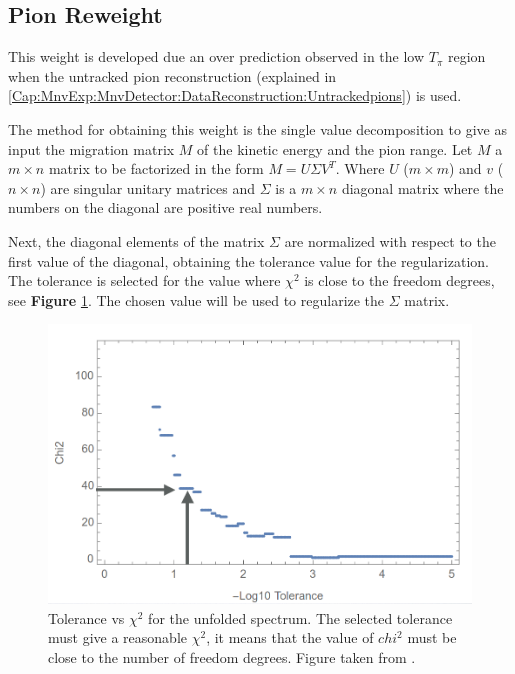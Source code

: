 \pagebreak

\subsection{Pion Reweight }
\label{Cap:Simulation:MnvGENIETunes:PionReweight}

This weight is developed due an over prediction observed in the low $T_\pi$ region when the untracked pion reconstruction (explained in \ref{Cap:MnvExp:MnvDetector:DataReconstruction:Untrackedpions}) is used.

The method for obtaining this weight is the single value decomposition to give as input the migration matrix $M$ of the kinetic energy and the pion range. Let $M$ a $m\times n$ matrix to be factorized in the form $M=U\Sigma V^T$. Where $U$ ($m\times m$) and $v$ ($n\times n$) are singular unitary matrices and $\Sigma$ is a $m\times n$ diagonal matrix where the numbers on the diagonal are positive real numbers. 

Next, the diagonal elements of the matrix $\Sigma$ are normalized with respect to the first value of the diagonal, obtaining the tolerance value for the regularization. The tolerance is selected for the value where $\chi^2$ is close to the freedom degrees, see \textbf{Figure} \ref{fig:Simulation:MnvGENIETunes:PionReweight:ToleranceTpiWeight}. The chosen value will be used to regularize the $\Sigma$ matrix.

\begin{figure}[!htb]
    \centering
    \includegraphics[scale=0.3]{Figures/Chapter3/ToleranceTpiweight.png}
    \caption{Tolerance vs $\chi^2$ for the unfolded spectrum. The selected tolerance must give a reasonable $\chi^2$, it means that the value of $chi^2$ must be close to the number of freedom degrees. Figure taken from \cite{PionReweight}.}
    \label{fig:Simulation:MnvGENIETunes:PionReweight:ToleranceTpiWeight}
\end{figure}

